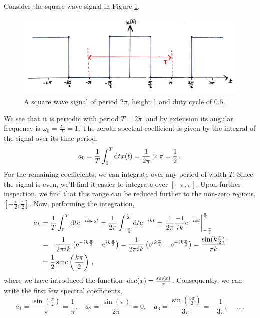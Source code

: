 \begin{exmp}
  Consider the square wave signal in Figure \ref{fig::lecture_4_square_wave}.
  \begin{figure}[!htb]
    \includegraphics[width=\textwidth]{images/lecture_4_square_wave.JPG}
    \caption{
      A square wave signal of period $2\pi$, height 1 and duty cycle of $0.5$.
    }
    \label{fig::lecture_4_square_wave}
  \end{figure}
  We see that it is periodic with period $T = 2\pi$, and by extension its
  angular frequency is $\omega_0 = \frac{2\pi}{T} = 1$. The zeroth spectral
  coefficient is given by the integral of the signal over its time period,
  \begin{displaymath}
    a_0 = \frac{1}{T}\int_0^T\mathrm{d}t\mkern1mu x(t) = \frac{1}{2\pi}\times\pi = \frac{1}{2} \,.
  \end{displaymath}
  For the remaining coefficients, we can integrate over any period of width $T$.
  Since the signal is even, we'll find it easier to integrate over $[-\pi,\pi]$.
  Upon further inspection, we find that this range can be reduced further to
  the non-zero regions, $[-\frac{\pi}{2},\frac{\pi}{2}]$. Now, performing the
  integration,
  \begin{align*}
    a_k &= \frac{1}{T}\int_0^T\mathrm{d}t\mkern1mu\mathrm{e}^{-{i\mkern1mu} k\omega_0 t}
    = \frac{1}{2\pi}\int_{-\frac{\pi}{2}}^{\frac{\pi}{2}} \mathrm{d}t\mkern1mu\mathrm{e}^{-{i\mkern1mu} kt}
    = \left.\frac{1}{2\pi}\frac{-1}{{i\mkern1mu} k}\mathrm{e}^{-{i\mkern1mu} kt}\right|_{-\frac{\pi}{2}}^{\frac{\pi}{2}} \\
    &= -\frac{1}{2\pi{i\mkern1mu} k}\left(\mathrm{e}^{-{i\mkern1mu} k\frac{\pi}{2}} - \mathrm{e}^{{i\mkern1mu} k\frac{\pi}{2}}\right)
    = \frac{1}{2\pi{i\mkern1mu} k}\left(\mathrm{e}^{{i\mkern1mu} k\frac{\pi}{2}} - \mathrm{e}^{-{i\mkern1mu} k\frac{\pi}{2}}\right)
    = \frac{\sin(k\frac{\pi}{2})}{\pi k} \\
    &= \frac{1}{2}\operatorname{sinc}\left(\frac{k\pi}{2}\right) \,,
  \end{align*}
  where we have introduced the function $\operatorname{sinc}(x) = \frac{\sin(x)}{x}$. Consequently,
  we can write the first few spectral coefficients,
  \begin{displaymath}
    a_1 = \frac{\sin\left(\frac{\pi}{2}\right)}{\pi} = \frac{1}{\pi}, \quad
    a_2 = \frac{\sin(\pi)}{2\pi} = 0, \quad
    a_3 = \frac{\sin\left(\frac{3\pi}{2}\right)}{3\pi} = -\frac{1}{3\pi}, \quad\hdots \,.
  \end{displaymath}
\end{exmp}
